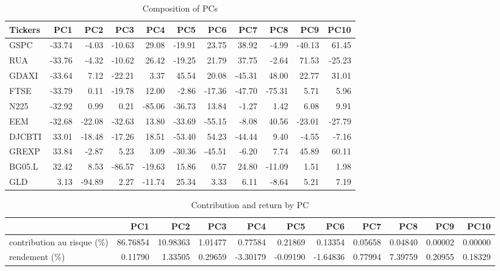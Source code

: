 \documentclass[
]{article}
\begin{document}
\begin{table}[H]

\caption{\label{tab:unnamed-chunk-7}Composition of PCs}
\centering
\begin{tabular}[t]{lrrrrrrrrrr}
\toprule
Tickers & PC1 & PC2 & PC3 & PC4 & PC5 & PC6 & PC7 & PC8 & PC9 & PC10\\
\midrule
GSPC & -33.74 & -4.03 & -10.63 & 29.08 & -19.91 & 23.75 & 38.92 & -4.99 & -40.13 & 61.45\\
RUA & -33.76 & -4.32 & -10.62 & 26.42 & -19.25 & 21.79 & 37.75 & -2.64 & 71.53 & -25.23\\
GDAXI & -33.64 & 7.12 & -22.21 & 3.37 & 45.54 & 20.08 & -45.31 & 48.00 & 22.77 & 31.01\\
FTSE & -33.79 & 0.11 & -19.78 & 12.00 & -2.86 & -17.36 & -47.70 & -75.31 & 5.71 & 5.96\\
N225 & -32.92 & 0.99 & 0.21 & -85.06 & -36.73 & 13.84 & -1.27 & 1.42 & 6.08 & 9.91\\
\addlinespace
EEM & -32.68 & -22.08 & -32.63 & 13.80 & -33.69 & -55.15 & -8.08 & 40.56 & -23.01 & -27.79\\
DJCBTI & 33.01 & -18.48 & -17.26 & 18.51 & -53.40 & 54.23 & -44.44 & 9.40 & -4.55 & -7.16\\
GREXP & 33.84 & -2.87 & 5.23 & 3.09 & -30.36 & -45.51 & -6.20 & 7.74 & 45.89 & 60.11\\
BG05.L & 32.42 & 8.53 & -86.57 & -19.63 & 15.86 & 0.57 & 24.80 & -11.09 & 1.51 & 1.98\\
GLD & 3.13 & -94.89 & 2.27 & -11.74 & 25.34 & 3.33 & 6.11 & -8.64 & 5.21 & 7.19\\
\bottomrule
\end{tabular}
\end{table}
\begin{table}[H]

\caption{\label{tab:unnamed-chunk-8}Contribution and return by PC}
\centering
\begin{tabular}[t]{lrrrrrrrrrr}
\toprule
  & PC1 & PC2 & PC3 & PC4 & PC5 & PC6 & PC7 & PC8 & PC9 & PC10\\
\midrule
contribution au risque (\%) & 86.76854 & 10.98363 & 1.01477 & 0.77584 & 0.21869 & 0.13354 & 0.05658 & 0.04840 & 0.00002 & 0.00000\\
rendement (\%) & 0.11790 & 1.33505 & 0.29659 & -3.30179 & -0.09190 & -1.64836 & 0.77994 & 7.39759 & 0.20955 & 0.18329\\
\bottomrule
\end{tabular}
\end{table}
\end{document}
